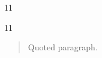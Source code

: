 \documentclass[paper=A4]{ropas-poster}
\begin{document}
\begin{postergrid}{1}{1}
\begin{posterblock}{1}{1}
\begin{quote}Quoted paragraph.\end{quote}
\end{posterblock}
\end{postergrid}
\end{document}
